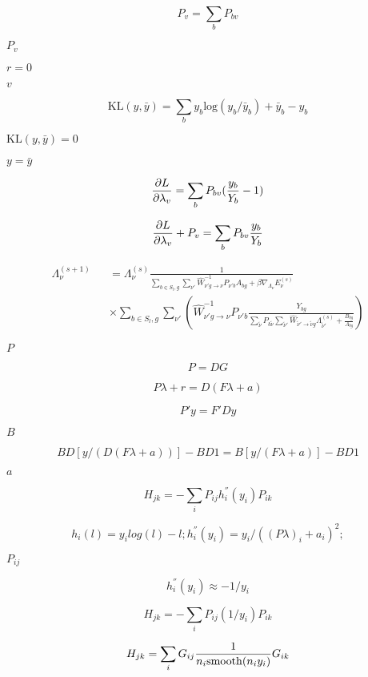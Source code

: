 \documentclass{article}
\begin{document}
\[ P_v = \sum_b P_{bv} \]
\pagebreak

$P_v$
\pagebreak

$r=0$
\pagebreak

$v$
\pagebreak

\[ \mathrm{KL}(y,\bar y) = \sum_b y_b \mathrm{log}(y_b/\bar y_b) + \bar y_b - y_b \]
\pagebreak

$\mathrm{KL}(y,\bar y)=0$
\pagebreak

$y=\bar y$
\pagebreak

\[ {\partial L \over \partial \lambda_v} = \sum_b P_{bv} ({y_b \over Y_b} - 1) \]
\pagebreak

\[ {\partial L \over \partial \lambda_v} + P_v = \sum_b P_{bv} {y_b \over Y_b} \]
\pagebreak

\[ \begin{array}{lcl} \Lambda_{\nu}^{(s+1)}&&=\Lambda_{\nu}^{(s)} \frac{1}{ \sum\limits_{b\in S_{l}, g} \sum\limits_{\nu'} \hat{W}^{-1} _{\nu'g\rightarrow \nu}P_{\nu' b}A_{bg}+\beta \nabla_{\Lambda_{\nu}} E_{\nu}^{(s)}}\\ &&\times \sum\limits_{b\in S_{l}, g} \sum\limits_{\nu'}\left(\hat{W}^{-1} _{\nu'g\rightarrow \nu}P_{\nu' b}\frac{Y_{bg}}{\sum\limits_{\tilde{\nu}}P_{b\tilde{\nu}}\sum\limits_{\tilde{\nu}'}\hat{W} _{\tilde{\nu}'\rightarrow \tilde{\nu}g}\Lambda_{\tilde{\nu}'}^{(s)}+\frac{B_{bg}}{A_{bg}}}\right) \end{array} \]
\pagebreak

$P$
\pagebreak

\[ P = D G \]
\pagebreak

\[ P \lambda + r = D ( F \lambda + a ) \]
\pagebreak

\[ P' y = F' D y \]
\pagebreak

$B$
\pagebreak

\[ B D \left[ y / \left( D (F \lambda + a) \right) \right] - B D 1 = B \left[ y / \left(F \lambda + a \right) \right] - B D 1 \]
\pagebreak

$a$
\pagebreak

\[ H_{jk} = - \sum_i P_{ij} h_i^{''}(y_i) P_{ik} \]
\pagebreak

\[ h_i(l) = y_i log (l) - l; h_i^{''}(y_i) = y_i / ((P \lambda)_i + a_i)^2; \]
\pagebreak

$P_{ij} $
\pagebreak

\[ h_i^{''}(y_i) \approx -1/y_i \]
\pagebreak

\[ H_{jk} = - \sum_i P_{ij}(1/y_i) P_{ik} \]
\pagebreak

\[ H_{jk} = \sum_i G_{ij}{1 \over n_i \mathrm{smooth}( n_i y_i)} G_{ik} \]
\pagebreak
\end{document}
